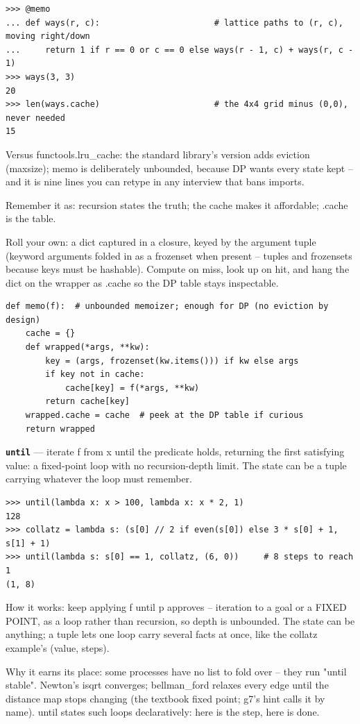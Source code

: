 \documentclass[10pt,letterpaper]{article}
\begin{document}
\begin{lstlisting}[style=ex]
>>> @memo
... def ways(r, c):                       # lattice paths to (r, c), moving right/down
...     return 1 if r == 0 or c == 0 else ways(r - 1, c) + ways(r, c - 1)
>>> ways(3, 3)
20
>>> len(ways.cache)                       # the 4x4 grid minus (0,0), never needed
15
\end{lstlisting}

Versus functools.lru\_cache: the standard library's version adds eviction (maxsize); memo is deliberately unbounded, because DP wants every state kept -- and it is nine lines you can retype in any interview that bans imports.


Remember it as: recursion states the truth; the cache makes it affordable; .cache is the table.


Roll your own: a dict captured in a closure, keyed by the argument tuple (keyword arguments folded in as a frozenset when present -- tuples and frozensets because keys must be hashable). Compute on miss, look up on hit, and hang the dict on the wrapper as .cache so the DP table stays inspectable.

\begin{lstlisting}[style=ex]
def memo(f):  # unbounded memoizer; enough for DP (no eviction by design)
    cache = {}
    def wrapped(*args, **kw):
        key = (args, frozenset(kw.items())) if kw else args
        if key not in cache:
            cache[key] = f(*args, **kw)
        return cache[key]
    wrapped.cache = cache  # peek at the DP table if curious
    return wrapped
\end{lstlisting}
\textbf{\texttt{until}} --- iterate f from x until the predicate holds, returning the first satisfying value: a fixed-point loop with no recursion-depth limit. The state can be a tuple carrying whatever the loop must remember.
\begin{lstlisting}[style=ex]
>>> until(lambda x: x > 100, lambda x: x * 2, 1)
128
>>> collatz = lambda s: (s[0] // 2 if even(s[0]) else 3 * s[0] + 1, s[1] + 1)
>>> until(lambda s: s[0] == 1, collatz, (6, 0))     # 8 steps to reach 1
(1, 8)
\end{lstlisting}

How it works: keep applying f until p approves -- iteration to a goal or a FIXED POINT, as a loop rather than recursion, so depth is unbounded. The state can be anything; a tuple lets one loop carry several facts at once, like the collatz example's (value, steps).


Why it earns its place: some processes have no list to fold over -- they run "until stable". Newton's isqrt converges; bellman\_ford relaxes every edge until the distance map stops changing (the textbook fixed point; g7's hint calls it by name). until states such loops declaratively: here is the step, here is done.
\end{document}
